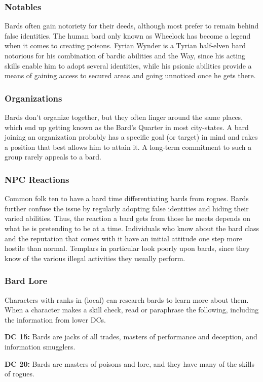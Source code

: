 \subsubsection{Notables}
Bards often gain notoriety for their deeds, although most prefer to remain behind false identities. The human bard only known as Wheelock has become a legend when it comes to creating poisons. Fyrian Wynder is a Tyrian half-elven bard notorious for his combination of bardic abilities and the Way, since his acting skills enable him to adopt several identities, while his psionic abilities provide a means of gaining access to secured areas and going unnoticed once he gets there.

\subsubsection{Organizations}
Bards don't organize together, but they often linger around the same places, which end up getting known as the Bard's Quarter in most city-states. A bard joining an organization probably has a specific goal (or target) in mind and rakes a position that best allows him to attain it. A long-term commitment to such a group rarely appeals to a bard.

\subsubsection{NPC Reactions}
Common folk ten to have a hard time differentiating bards from rogues. Bards further confuse the issue by regularly adopting false identities and hiding their varied abilities. Thus, the reaction a bard gets from those he meets depends on what he is pretending to be at a time. Individuals who know about the bard class and the reputation that comes with it have an initial attitude one step more hostile than normal. Templars in particular look poorly upon bards, since they know of the various illegal activities they usually perform.

\subsubsection{Bard Lore}
Characters with ranks in  (local) can research bards to learn more about them. When a character makes a skill check, read or paraphrase the following, including the information from lower DCs.

\textbf{DC 15:} Bards are jacks of all trades, masters of performance and deception, and information smugglers.

\textbf{DC 20:} Bards are masters of poisons and lore, and they have many of the skills of rogues.